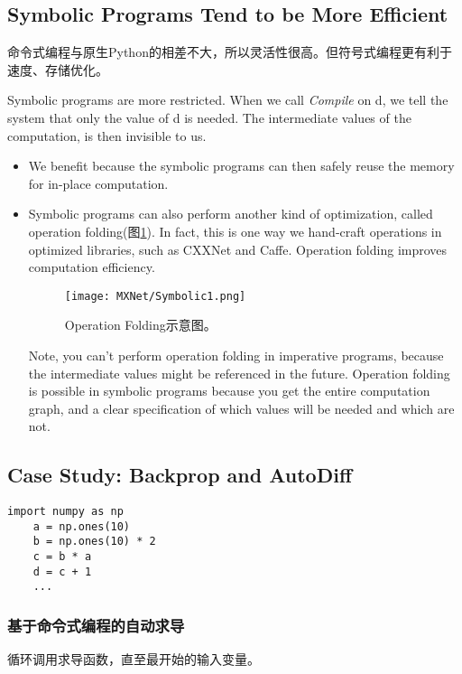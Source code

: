 \subsection{Symbolic Programs Tend to be More Efficient}

命令式编程与原生Python的相差不大，所以灵活性很高。但符号式编程更有利于速度、存储优化。

Symbolic programs are more restricted. When we call \textit{Compile} on d, we tell the system that only the value of d is needed. The intermediate values of the computation, is then invisible to us.

\begin{itemize}
\item We benefit because the symbolic programs can then safely reuse the memory for in-place computation. 

\item Symbolic programs can also perform another kind of optimization, called operation folding(图\ref{Symbolic1}). In fact, this is one way we hand-craft operations in optimized libraries, such as CXXNet and Caffe. Operation folding improves computation efficiency.

\begin{figure}
\centering
\texttt{[image: MXNet/Symbolic1.png]}
\caption{Operation Folding示意图。}
\label{Symbolic1}
\end{figure}

Note, you can’t perform operation folding in imperative programs, because the intermediate values might be referenced in the future. Operation folding is possible in symbolic programs because you get the entire computation graph, and a clear specification of which values will be needed and which are not.
\end{itemize}

\subsection{Case Study: Backprop and AutoDiff}
\lstset{language=Python}
\begin{lstlisting}[title=toy model,frame=shadowbox]
import numpy as np
    a = np.ones(10)
    b = np.ones(10) * 2
    c = b * a
    d = c + 1
    ...
\end{lstlisting}


\subsubsection{基于命令式编程的自动求导}
循环调用求导函数，直至最开始的输入变量。

